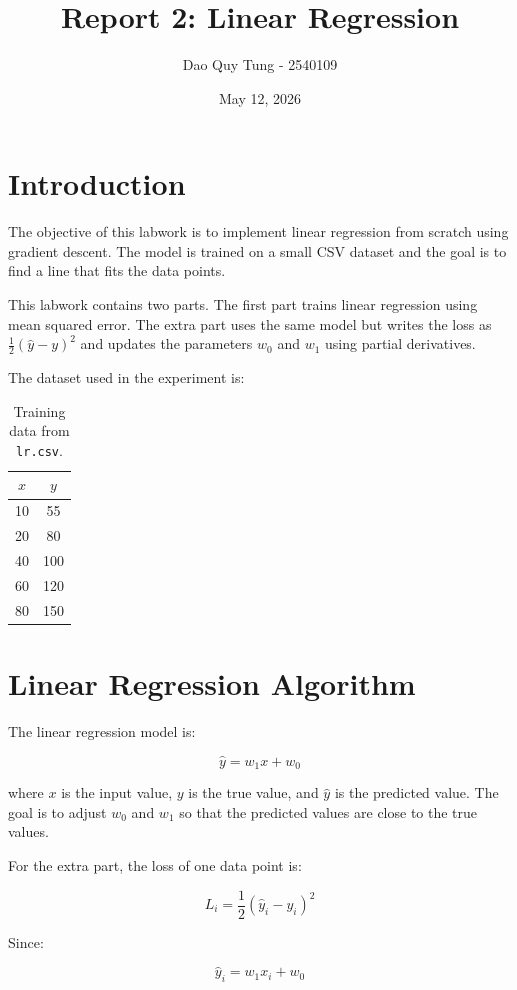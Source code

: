 \documentclass[12pt,a4paper]{article}
\title{Report 2: Linear Regression}
\author{Dao Quy Tung - 2540109}
\date{May 12, 2026}
\begin{document}
\maketitle

\section{Introduction}

The objective of this labwork is to implement linear regression from scratch using gradient descent.
The model is trained on a small CSV dataset and the goal is to find a line that fits the data points.

This labwork contains two parts. The first part trains linear regression using mean squared error. The extra part uses the same model but writes the loss as \(\frac{1}{2}(\hat{y}-y)^2\) and updates the parameters \(w_0\) and \(w_1\) using partial derivatives.

The dataset used in the experiment is:

\begin{table}[H]
\centering
\begin{tabular}{cc}
\toprule
\(x\) & \(y\) \\
\midrule
10 & 55 \\
20 & 80 \\
40 & 100 \\
60 & 120 \\
80 & 150 \\
\bottomrule
\end{tabular}
\caption{Training data from \texttt{lr.csv}.}
\end{table}

\section{Linear Regression Algorithm}

The linear regression model is:

\[
\hat{y} = w_1x + w_0
\]

where \(x\) is the input value, \(y\) is the true value, and \(\hat{y}\) is the predicted value.
The goal is to adjust \(w_0\) and \(w_1\) so that the predicted values are close to the true values.

For the extra part, the loss of one data point is:

\[
L_i = \frac{1}{2}(\hat{y}_i - y_i)^2
\]

Since:

\[
\hat{y}_i = w_1x_i + w_0
\]
\end{document}
